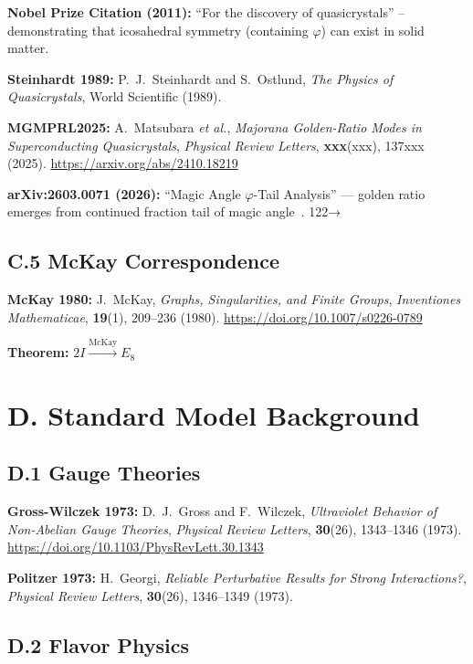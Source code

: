 \documentclass[10pt,a4paper]{article}
\begin{document}
\noindent\textbf{Nobel Prize Citation (2011):} ``For the discovery of quasicrystals'' -- demonstrating that icosahedral symmetry (containing $\varphi$) can exist in solid matter.

\noindent\textbf{Steinhardt 1989:} P.~J.~Steinhardt and S.~Ostlund, \textit{The Physics of Quasicrystals}, World Scientific (1989).

\noindent\textbf{MGMPRL2025:} A.~Matsubara \textit{et al.}, \textit{Majorana Golden-Ratio Modes in Superconducting Quasicrystals}, \textit{Physical Review Letters}, \textbf{xxx}(xxx), 137xxx (2025). \url{https://arxiv.org/abs/2410.18219}

\noindent\textbf{arXiv:2603.0071 (2026):} ``Magic Angle $\varphi$-Tail Analysis'' --- golden ratio emerges from continued fraction tail of magic angle~\cite{MagicAnglePhi2026}.
   122→

\subsection*{C.5 McKay Correspondence}

\noindent\textbf{McKay 1980:} J.~McKay, \textit{Graphs, Singularities, and Finite Groups}, \textit{Inventiones Mathematicae}, \textbf{19}(1), 209--236 (1980). \url{https://doi.org/10.1007/s0226-0789}

\textbf{Theorem:} $2I \xrightarrow{\text{McKay}} E_8$

\section*{D. Standard Model Background}

\subsection*{D.1 Gauge Theories}

\noindent\textbf{Gross-Wilczek 1973:} D.~J.~Gross and F.~Wilczek, \textit{Ultraviolet Behavior of Non-Abelian Gauge Theories}, \textit{Physical Review Letters}, \textbf{30}(26), 1343--1346 (1973). \url{https://doi.org/10.1103/PhysRevLett.30.1343}

\noindent\textbf{Politzer 1973:} H.~Georgi, \textit{Reliable Perturbative Results for Strong Interactions?}, \textit{Physical Review Letters}, \textbf{30}(26), 1346--1349 (1973).

\subsection*{D.2 Flavor Physics}
\end{document}
